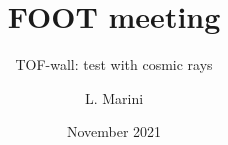\title[FOOT meeting]{FOOT meeting}
\subtitle[]{TOF-wall: test with cosmic rays}
\author[L. Marini, INFN Pisa ]{L. Marini} 
\date[November 2021]{November 2021}
